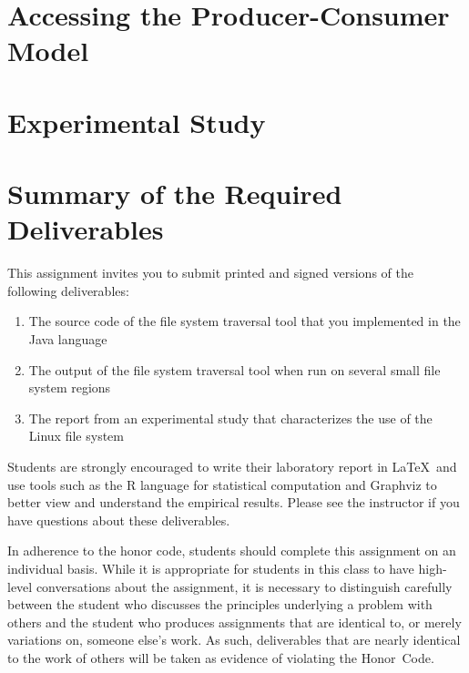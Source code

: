 \section*{Accessing the Producer-Consumer Model}



\section*{Experimental Study}

\section*{Summary of the Required Deliverables}

This assignment invites you to submit printed and signed versions of the following deliverables: 

  \begin{enumerate}
    \item The source code of the file system traversal tool that you implemented in the Java language
    \item The output of the file system traversal tool when run on several small file system regions
    \item The report from an experimental study that characterizes the use of the Linux file system
  \end{enumerate}

Students are strongly encouraged to write their laboratory report in \LaTeX~and use tools such as the R language for statistical
computation and Graphviz to better view and understand the empirical results. Please see the instructor if you have questions
about these deliverables.

In adherence to the honor code, students should complete this assignment on an individual basis. While it is appropriate for
students in this class to have high-level conversations about the assignment, it is necessary to distinguish carefully between the
student who discusses the principles underlying a problem with others and the student who produces assignments that are identical
to, or merely variations on, someone else's work.  As such, deliverables that are nearly identical to the work of others will be
taken as evidence of violating the \mbox{Honor Code}.  



  
